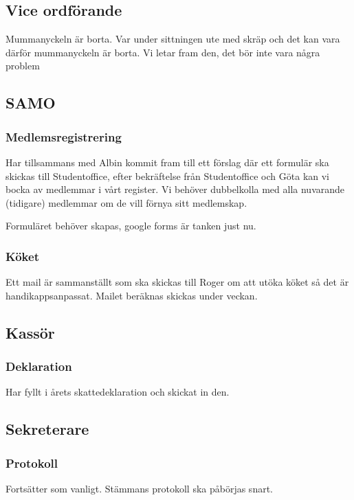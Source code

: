 \documentclass[protokoll]{dvd}
\begin{document}
\subsection{Vice ordförande}
        Mummanyckeln är borta. Var under sittningen ute med skräp och det kan vara därför mummanyckeln är borta. Vi letar fram den, det bör inte vara några problem 



\subsection{SAMO}

    \subsubsection*{Medlemsregistrering}
        Har tillsammans med Albin kommit fram till ett förslag där ett formulär ska skickas till Studentoffice, efter bekräftelse från Studentoffice och Göta kan vi bocka av medlemmar i vårt register.
        Vi behöver dubbelkolla med alla nuvarande (tidigare) medlemmar om de vill förnya sitt medlemskap.

    Formuläret behöver skapas, google forms är tanken just nu.

    \subsubsection*{Köket}
        Ett mail är sammanställt som ska skickas till Roger om att utöka köket så det är handikappsanpassat.
        Mailet beräknas skickas under veckan.

\newpage



\subsection{Kassör}
    \subsubsection*{Deklaration}
    Har fyllt i årets skattedeklaration och skickat in den. 



\subsection{Sekreterare}
    \subsubsection*{Protokoll}
    Fortsätter som vanligt. Stämmans protokoll ska påbörjas snart.
\end{document}
